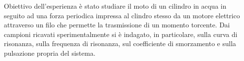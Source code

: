 Obiettivo dell'esperienza è stato studiare il moto di un cilindro in acqua in seguito ad una forza periodica impressa
al clindro stesso da un motore elettrico attraverso un filo che permette la trasmissione di un momento torcente.
Dai campioni ricavati sperimentalmente si è indagato, in particolare, sulla curva di risonanza,  sulla frequenza di risonanza, sul coefficiente di smorzamento e sulla pulsazione propria del sistema.
